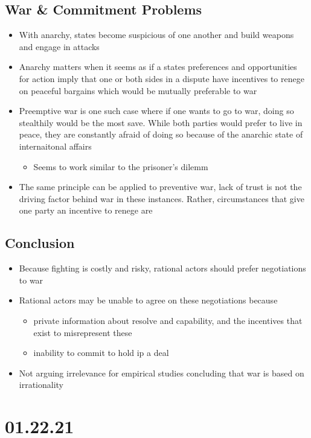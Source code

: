 \documentclass[11pt]{article}
\begin{document}
\subsection{War \& Commitment Problems}
\label{sec:orge3645f2}
\begin{itemize}
\item With anarchy, states become suspicious of one another and build weapons and engage in attacks
\item Anarchy matters when it seems as if a states preferences and opportunities for action imply that one or both sides in a dispute have incentives to renege on peaceful bargains which would be mutually preferable to war
\item Preemptive war is one such case where if one wants to go to war, doing so stealthily would be the most save. While both parties would prefer to live in peace, they are constantly afraid of doing so because of the anarchic state of internaitonal affairs
\begin{itemize}
\item Seems to work similar to the prisoner's dilemm
\end{itemize}
\item The same principle can be applied to preventive war, lack of trust is not the driving factor behind war in these instances. Rather, circumstances that give one party an incentive to renege are
\end{itemize}
\subsection{Conclusion}
\label{sec:orgbb5ae44}
\begin{itemize}
\item Because fighting is costly and risky, rational actors should prefer negotiations to war
\item Rational actors may be unable to agree on these negotiations because
\begin{itemize}
\item private information about resolve and capability, and the incentives that exist to misrepresent these
\item inability to commit to hold ip a deal
\end{itemize}
\item Not arguing irrelevance for empirical studies concluding that war is based on irrationality
\end{itemize}
\section{01.22.21}
\label{sec:orge3d73fb}
\end{document}
